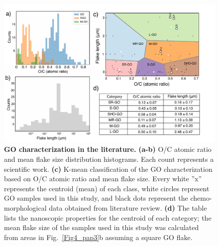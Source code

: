 \begin{figure}[h]
  \centering
  \includegraphics[width=6in]{paper3/Fig6.pdf}
  \caption{\textbf{GO characterization in the literature.} \textbf{(a-b)} O/C atomic ratio and mean flake size distribution histograms. Each count represents a scientific work. \textbf{(c)} K-mean classification of the GO characterization based on O/C atomic ratio and mean flake size. Every white ''x'' represents the centroid (mean) of each class, white circles represent GO samples used in this study, and black dots represent the chemo-morphological data obtained from literature review.  \textbf{(d)} The table lists the nanoscopic properties for the centroid of each category; the mean flake size of the samples used in this study was calculated from areas in Fig.~\ref{Fig4_pap3}b assuming a square GO flake.}
  \label{Fig6_pap3}
\end{figure}

